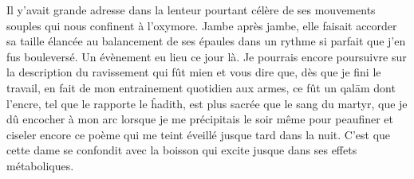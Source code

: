 \begin{prose}
Il y’avait grande adresse dans la lenteur pourtant célère de ses mouvements souples qui nous confinent à l’oxymore. Jambe après jambe, elle faisait accorder sa taille élancée au balancement de  ses épaules dans un rythme si parfait que j’en fus bouleversé. Un évènement eu lieu ce jour là. Je pourrais encore poursuivre sur la description du ravissement qui fût mien et vous dire que, dès que je fini le travail, en fait de mon entrainement quotidien aux armes, ce fût un qalām dont l’encre, tel que le rapporte le ĥadith, est plus sacrée que le sang du martyr, que je dû encocher à mon arc lorsque je  me précipitais le soir même pour peaufiner et ciseler encore ce poème qui me teint éveillé jusque tard dans la nuit. C’est que cette dame se confondit avec la boisson qui excite jusque dans ses effets métaboliques.
\end{prose}

